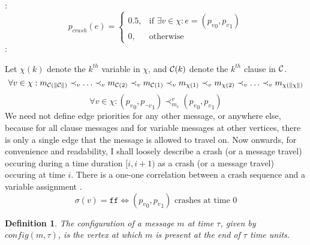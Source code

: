 \documentclass[11pt,eepic]{article}
\newcommand{\C}{{\cal C}}
\newcommand{\ff}{\texttt{ff}}
\newtheorem{definition}{Definition}[section]
\begin{document}
		:
		\[
		    p_{crash}(e) =
		\begin{cases}
		    0.5,& \text{if } \exists v \in \chi: e=({p_v}_0,{p_v}_1)\\
			    0, & \text{otherwise}
		\end{cases}
		\]
		:

		Let $\chi(k)$ denote the $k^{th}$ variable in $\chi$, and $\C(k)$ denote the $k^{th}$ clause in $\C$.
		$$\forall v \in \chi: m_{\C(\Vert\C\Vert)} \prec_v \ldots \prec_v m_{\C(2)} \prec_v m_{\C(1)} \prec_v m_{\chi(1)} \prec_v m_{\chi(2)} \prec_v \ldots \prec_v m_{\chi(\Vert\chi\Vert)}$$
		$$\forall v \in \chi: ({p_v}_0,{p_{\neg v}}_1) \prec_{m_v}^v ({p_v}_0,{p_v}_1)$$
		We need not define edge priorities for any other message, or anywhere else, because for all clause messages and for variable messages at other vertices, there is only a single edge that the message is allowed to travel on. Now onwards, for convenience and readability, I shall loosely describe a crash (or a message travel) occuring during a time duration $[i,i+1)$ as a crash (or a message travel) occuring at time $i$. There is a one-one correlation between a crash sequence and a variable assignment \sigma.
		$$\sigma(v) = \ff \iff ({p_v}_0,{p_v}_1) \text{ crashes at time }0 $$ %

		\begin{definition}
		The configuration of a message $m$ at time $\tau$, given by $config(m,\tau)$, is the vertex at which $m$ is present at the end of $\tau$ time units.
		\end{definition}
\end{document}
